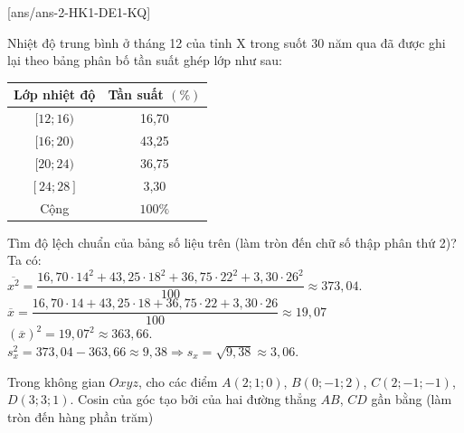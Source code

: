 [ans/ans-2-HK1-DE1-KQ]
\caukq
\begin{ex}%
Nhiệt độ trung bình ở tháng 12 của tỉnh X trong suốt 30 năm qua đã được ghi lại theo bảng phân bố tần suất ghép lớp như sau:
\begin{center} 
	\begin{tabular}{|c|c|}\hline
		{Lớp nhiệt độ}&{Tần suất $(\%)$}\\
		\hline
		{$[12;16)$}&{16,70}\\
		\hline
		{$[16;20)$}&{43,25}\\
		\hline
		{$[20;24)$}&{36,75}\\
		\hline
		{$[24;28]$}&{3,30}\\
		\hline
		{Cộng}&{$100\%$}\\
		\hline
	\end{tabular}
\end{center}
Tìm độ lệch chuẩn của bảng số liệu trên (làm tròn đến chữ số thập phân thứ 2)?
\loigiai
{Ta có:\\
	$\overline{x^2}=\dfrac{16{,}70\cdot 14^2+43{,}25\cdot 18^2+36{,}75\cdot 22^2+3{,}30\cdot 26^2}{100}\approx373{,}04$.\\
	$\overline{x}=\dfrac{16{,}70\cdot 14+43{,}25\cdot 18+36{,}75\cdot 22+3{,}30\cdot 26}{100}\approx19{,}07$\\
	$(\overline{x})^2=19{,}07^2\approx363{,}66$.\\
	$s_x^2=373{,}04-363{,}66\approx9{,}38 \Rightarrow s_x=\sqrt{9{,}38}\approx 3{,}06$.
}
\end{ex}

\begin{ex}%
Trong không gian $Oxyz$, cho các điểm $A(2;1;0)$, $B(0;-1;2)$, $C(2;-1;-1)$, $D(3;3;1)$. Cosin của góc tạo bởi của hai đường thẳng $AB$, $CD$ gần bằng (làm tròn đến hàng phần trăm)
\end{ex}

